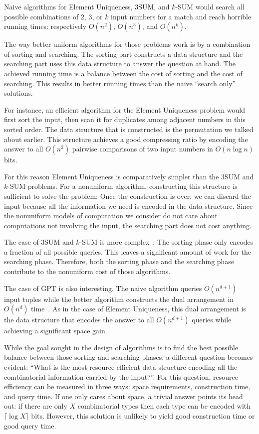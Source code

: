 Naive algorithms for Element Uniqueness, 3SUM, and \(k\)-SUM would search
all possible combinations of \(2\), \(3\), or \(k\) input numbers for a match
and reach horrible running times: respectively \(O(n^2)\), \(O(n^3)\), and \(O(n^k)\).

The way better uniform algorithms for those problems work
is by a combination of sorting and searching. The sorting part
constructs a data structure and the searching part uses this data structure to
answer the question at hand. The achieved running time is a balance between the
cost of sorting and the cost of searching. This results in better
running times than the naive ``search only'' solutions.

For instance, an efficient algorithm for the
Element Uniqueness problem would first sort the input, then scan it for
duplicates among adjacent numbers in this sorted order. The data structure that
is constructed is the permutation we talked about earlier. This structure
achieves a good compressing ratio by encoding the answer to all \(O(n^2)\)
pairwise comparisons of two input numbers in \(O(n \log n)\) bits.

For this reason Element Uniqueness is comparatively simpler than the 3SUM and
\(k\)-SUM problems.
For a nonuniform algorithm, constructing this structure is sufficient to solve
the problem: Once the construction is over, we can discard the input because
all the information we need is encoded in the data structure. Since the nonuniform
models of computation we consider do not care about computations not involving
the input, the searching part does not cost anything.

The case of 3SUM and \(k\)-SUM is more complex~\cite{GP18}:
The sorting phase only encodes
a fraction of all possible queries. This leaves a significant amount of work
for the searching phase. Therefore, both the sorting phase and the searching
phase contribute to the nonuniform cost of those algorithms.

The case of GPT is also interesting. The naive algorithm queries
\(O(n^{d+1})\) input tuples while the better algorithm constructs the dual
arrangement in \(O(n^d)\) time~\cite[Theorem 24.4.1]{Hal04}.
As in the case of Element Uniqueness,
this dual arrangement is the data structure that encodes the answer to all
\(O(n^{d+1})\) queries while achieving a significant space gain.

While the goal sought in the design of algorithms is to find the best possible
balance between those sorting and searching phases, a different question becomes
evident: ``What is the most resource efficient data structure encoding all the
combinatorial information carried by the input?''. For this question, resource
efficiency can be measured in three ways: space requirements, construction
time, and query time. If one only cares about space, a trivial answer
points its head out: if there are only \(X\) combinatorial types then each type
can be encoded with \(\lceil \log X \rceil\) bits. However, this solution is
unlikely to yield good construction time or good query time.

